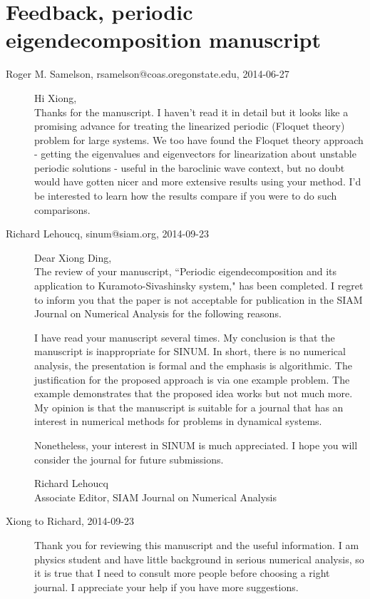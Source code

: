 \section{Feedback, periodic eigendecomposition manuscript}
\begin{description}

\item[Roger M. Samelson, rsamelson@coas.oregonstate.edu, 2014-06-27]

Hi Xiong,
\\
Thanks for the manuscript.  I haven't read it in detail but it looks like
a promising advance for treating the linearized periodic (Floquet theory)
problem for large systems.  We too have found the Floquet theory approach
- getting the eigenvalues and eigenvectors for linearization about
unstable periodic solutions - useful in the baroclinic wave
context, but
no doubt would have gotten nicer and more extensive results using your
method.  I'd be interested to learn how the results compare if you were
to do such comparisons.

\item[Richard Lehoucq, sinum@siam.org, 2014-09-23]
Dear Xiong Ding,
\\
The review of your manuscript, ``Periodic eigendecomposition and its
application to Kuramoto-Sivashinsky system," has been completed. I regret
to inform you that the paper is not acceptable for publication in the
SIAM Journal on Numerical Analysis for the following reasons.

I have read your manuscript several times. My conclusion
is that the manuscript is inappropriate for SINUM. In short, there is no
numerical analysis, the presentation is formal and the emphasis is
algorithmic. The justification for the proposed approach is via one
example problem. The example demonstrates that the proposed idea works
but not much more. My opinion is that the manuscript is suitable for a
journal that has an interest in numerical methods for problems in
dynamical systems.

Nonetheless, your interest in SINUM is much appreciated. I hope you will
consider the journal for future submissions.

Richard Lehoucq\\
Associate Editor,
SIAM Journal on Numerical Analysis

\item[Xiong to Richard, 2014-09-23]
Thank you for reviewing this manuscript and the useful information. I am
physics student and have little background in serious numerical analysis, so it
is true that I need to consult more people before choosing a right journal. I
appreciate your help if you have more suggestions.


\end{description}
